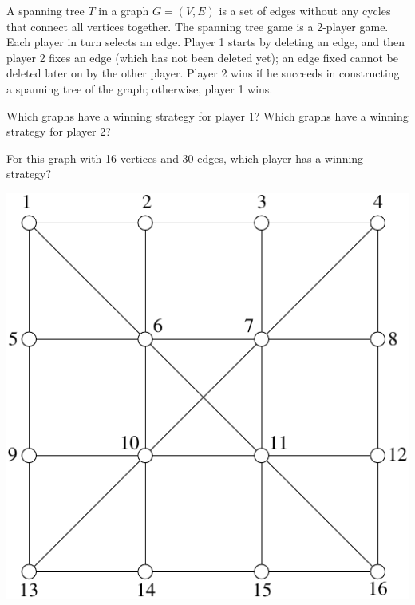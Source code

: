 \documentclass[12pt]{article}
\begin{document}

A spanning tree $T$ in a graph $G=(V,E)$ is a set of edges without any
cycles that connect all vertices together. The spanning tree game is a
2-player game. Each player in turn selects an edge. Player 1 starts by
deleting an edge, and then player 2 fixes an edge (which has not been
deleted yet); an edge fixed
cannot be deleted later on by the other player. Player 2 wins if he
succeeds in constructing a spanning tree of the graph; otherwise,
player 1 wins. 

Which graphs have a winning strategy for player 1? Which graphs have a
winning strategy for player 2?

For this graph with 16 vertices and 30 edges, which player has a
winning strategy? 


\begin{center}
\includegraphics{../figures/mst-game}
\end{center}
\end{document}
